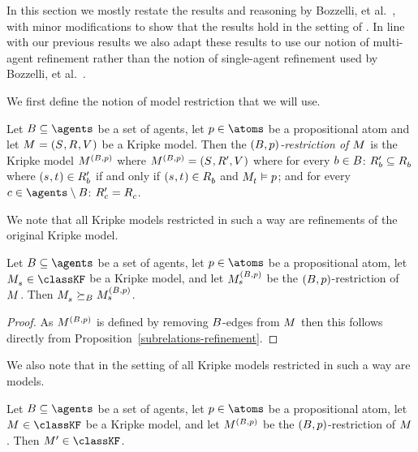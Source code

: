 In this section we mostly restate the results and reasoning by Bozzelli, et al.~\cite{bozzelli:2014b}, with minor modifications to show that the results hold in the setting of \classKF{}.
In line with our previous results we also adapt these results to use our notion of multi-agent refinement rather than the notion of single-agent refinement used by Bozzelli, et al.~\cite{bozzelli:2014b}.

We first define the notion of model restriction that we will use.

\begin{definition}
Let $\agentsB \subseteq \agents$ be a set of agents, let $\atomP \in \atoms$ be a propositional atom and let $\kModelAndTuple$ be a Kripke model.
Then the {\em $(\agentsB, \atomP)$-restriction of $\kModel$} is the Kripke model $\kModel[(\agentsB, \atomP)]$ where $\kModel[(\agentsB, \atomP)] = (\kStates, \kAccessibilityP{}, \kValuation)$ where for every $\agentB \in \agentsB$: $\kAccessibilityPB \subseteq \kAccessibilityB$ where $(\kStateS, \kStateT) \in \kAccessibilityPB$ if and only if $(\kStateS, \kStateT) \in \kAccessibilityB$ and $\kPModel{\kStateT} \entails \atomP$; and for every $\agentC \in \agents \setminus \agentsB$: $\kAccessibilityPC = \kAccessibilityC$.
\end{definition}

We note that all Kripke models restricted in such a way are refinements of the original Kripke model.

\begin{lemma}\label{rml-k4-restriction-refinement}
Let $\agentsB \subseteq \agents$ be a set of agents, let $\atomP \in \atoms$ be a propositional atom, let $\kPModel{\kStateS} \in \classKF$ be a Kripke model, and let $\kPModel[(\agentsB, \atomP)]{\kStateS}$ be the $(\agentsB, \atomP)$-restriction of $\kModel$.
Then $\kPModel{\kStateS} \simulatesBs \kPModel[(\agentsB, \atomP)]{\kStateS}$.
\end{lemma}

\begin{proof}
As $\kModel[(\agentsB, \atomP)]$ is defined by removing $\agentsB$-edges from $\kModel$ then this follows directly from Proposition~\ref{subrelations-refinement}.
\end{proof}

We also note that in the setting of \classKF{} all Kripke models restricted in such a way are \classKF{} models.

\begin{lemma}\label{rml-k4-restriction-k4}
Let $\agentsB \subseteq \agents$ be a set of agents, let $\atomP \in \atoms$ be a propositional atom, let $\kModel \in \classKF$ be a Kripke model, and let $\kModel[(\agentsB, \atomP)]$ be the $(\agentsB, \atomP)$-restriction of $\kModel$.
Then $\kModelP \in \classKF$.
\end{lemma}

